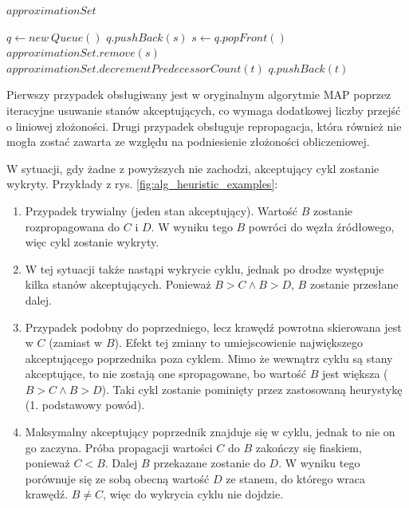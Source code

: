 \begin{algorithm}
\caption{$ eliminateNoPredecessors(approximationSet) $}
\label{alg:eliminateNoPredecessors}
\begin{algorithmic}[1]
\REQUIRE $ approximationSet $

\STATE $ q \leftarrow new\ Queue() $
    \STATE $ q.pushBack(s) $
  \ENDIF
\ENDFOR
{}
  \STATE $ s \leftarrow q.popFront() $
  \STATE $ approximationSet.remove(s) $
    \STATE $ approximationSet.decrementPredecessorCount(t) $
      \STATE $ q.pushBack(t) $
    \ENDIF
  \ENDFOR
\ENDWHILE
\end{algorithmic}
\end{algorithm}

Pierwszy przypadek obsługiwany jest w oryginalnym algorytmie MAP poprzez iteracyjne usuwanie stanów akceptujących, co wymaga dodatkowej liczby przejść o liniowej złożoności.
Drugi przypadek obsługuje repropagacja, która również nie mogła zostać zawarta ze względu na podniesienie złożoności obliczeniowej.

W sytuacji, gdy żadne z powyższych nie zachodzi, akceptujący cykl zostanie wykryty.
Przykłady z rys. \ref{fig:alg_heuristic_examples}:
\begin{enumerate}[label=(\alph*)]
\item Przypadek trywialny (jeden stan akceptujący). Wartość $B$ zostanie rozpropagowana do $C$ i $D$. W wyniku tego $B$ powróci do węzła źródłowego, więc cykl zostanie wykryty.
\item W tej sytuacji także nastąpi wykrycie cyklu, jednak po drodze występuje kilka stanów akceptujących. Ponieważ $ B > C \land B > D $, $B$ zostanie przesłane dalej.
\item Przypadek podobny do poprzedniego, lecz krawędź powrotna skierowana jest w $C$ (zamiast w $B$). Efekt tej zmiany to umiejscowienie największego akceptującego poprzednika poza cyklem. Mimo że wewnątrz cyklu są stany akceptujące, to nie zostają one spropagowane, bo wartość $B$ jest większa ($ B > C \land B > D $). Taki cykl zostanie pominięty przez zastosowaną heurystykę (1. podstawowy powód).
\item Maksymalny akceptujący poprzednik znajduje się w cyklu, jednak to nie on go zaczyna. Próba propagacji wartości $C$ do $B$ zakończy się fiaskiem, ponieważ $ C < B $. Dalej $B$ przekazane zostanie do $D$. W wyniku tego porównuje się ze sobą obecną wartość $D$ ze stanem, do którego wraca krawędź. $ B \neq C $, więc do wykrycia cyklu nie dojdzie.
\end{enumerate}


